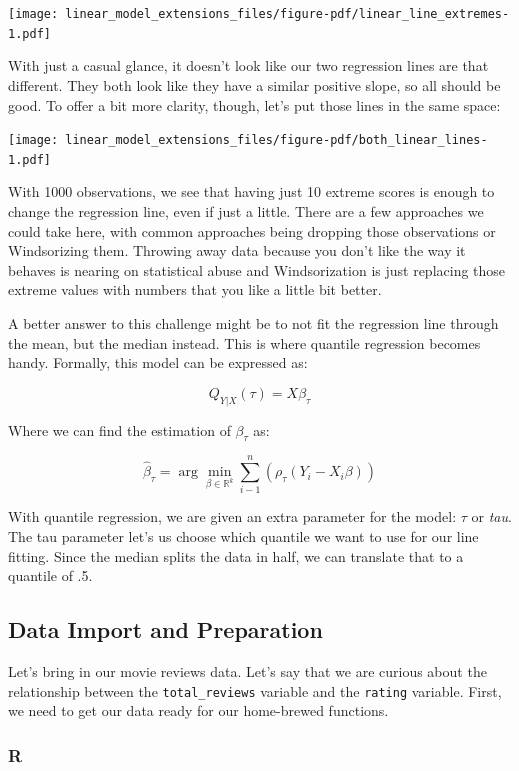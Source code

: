 \documentclass[
  letterpaper,
]{krantz}
\begin{document}
\texttt{[image: linear\_model\_extensions\_files/figure-pdf/linear\_line\_extremes-1.pdf]}

With just a casual glance, it doesn't look like our two regression lines
are that different. They both look like they have a similar positive
slope, so all should be good. To offer a bit more clarity, though, let's
put those lines in the same space:

\texttt{[image: linear\_model\_extensions\_files/figure-pdf/both\_linear\_lines-1.pdf]}

With 1000 observations, we see that having just 10 extreme scores is
enough to change the regression line, even if just a little. There are a
few approaches we could take here, with common approaches being dropping
those observations or Windsorizing them. Throwing away data because you
don't like the way it behaves is nearing on statistical abuse and
Windsorization is just replacing those extreme values with numbers that
you like a little bit better.

A better answer to this challenge might be to not fit the regression
line through the mean, but the median instead. This is where quantile
regression becomes handy. Formally, this model can be expressed as:

\[
Q_{Y\vert X}(\tau) = X\beta_\tau
\]

Where we can find the estimation of \(\beta_\tau\) as:

\[
\hat\beta_\tau = \arg \min_{\beta \in \mathbb{R}^k} \sum_{i-1}^n(\rho_\tau(Y_i-X_i\beta))
\]

With quantile regression, we are given an extra parameter for the model:
\(\tau\) or \emph{tau}. The tau parameter let's us choose which quantile
we want to use for our line fitting. Since the median splits the data in
half, we can translate that to a quantile of .5.

\subsection{Data Import and
Preparation}\label{data-import-and-preparation-1}

Let's bring in our movie reviews data. Let's say that we are curious
about the relationship between the \texttt{total\_reviews} variable and
the \texttt{rating} variable. First, we need to get our data ready for
our home-brewed functions.

\subsubsection{R}
\end{document}
